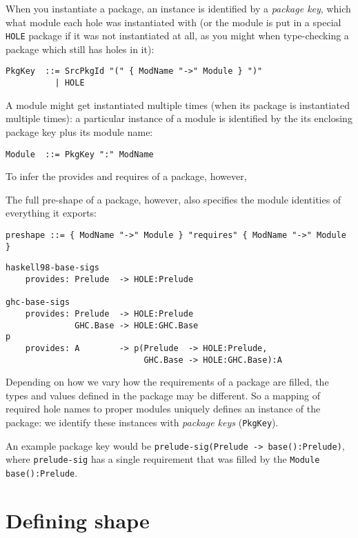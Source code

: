 \documentclass{article}
\begin{document}
When you instantiate a package, an instance is identified by a \emph{package key},
which what module each hole was instantiated with (or the module is put
in a special \verb|HOLE| package if it was not instantiated at all, as you
might when type-checking a package which still has holes in it):

\begin{verbatim}
PkgKey  ::= SrcPkgId "(" { ModName "->" Module } ")"
          | HOLE
\end{verbatim}

A module might get instantiated multiple times (when its package is instantiated
multiple times): a particular instance of a module is identified by the
its enclosing package key plus its module name:

\begin{verbatim}
Module  ::= PkgKey ":" ModName
\end{verbatim}

To infer the provides and requires of a package, however, 

The full pre-shape of a package, however, also specifies the module identities
of everything it exports:

\begin{verbatim}
preshape ::= { ModName "->" Module } "requires" { ModName "->" Module }
\end{verbatim}

\begin{verbatim}
haskell98-base-sigs
    provides: Prelude  -> HOLE:Prelude

ghc-base-sigs
    provides: Prelude  -> HOLE:Prelude
              GHC.Base -> HOLE:GHC.Base
p
    provides: A        -> p(Prelude  -> HOLE:Prelude,
                            GHC.Base -> HOLE:GHC.Base):A
\end{verbatim}


Depending on how we vary how the requirements of a package are filled,
the types and values defined in the package may be different.  So a
mapping of required hole names to proper modules uniquely defines an
instance of the package: we identify these instances with \emph{package
keys} (\verb|PkgKey|).



An example package key would be \verb|prelude-sig(Prelude -> base():Prelude)|,
where \verb|prelude-sig| has a single requirement that was filled by the
\verb|Module| \verb|base():Prelude|.

\section{Defining shape}
\end{document}
